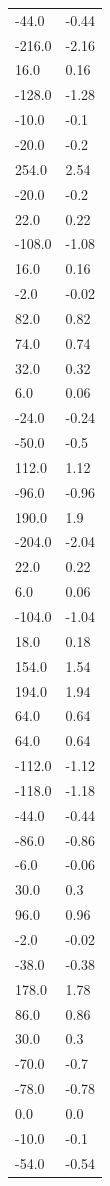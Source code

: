 \begin{longtable}{ll}
-44.0 & -0.44 \\
-216.0 & -2.16 \\
16.0 & 0.16 \\
-128.0 & -1.28 \\
-10.0 & -0.1 \\
-20.0 & -0.2 \\
254.0 & 2.54 \\
-20.0 & -0.2 \\
22.0 & 0.22 \\
-108.0 & -1.08 \\
16.0 & 0.16 \\
-2.0 & -0.02 \\
82.0 & 0.82 \\
74.0 & 0.74 \\
32.0 & 0.32 \\
6.0 & 0.06 \\
-24.0 & -0.24 \\
-50.0 & -0.5 \\
112.0 & 1.12 \\
-96.0 & -0.96 \\
190.0 & 1.9 \\
-204.0 & -2.04 \\
22.0 & 0.22 \\
6.0 & 0.06 \\
-104.0 & -1.04 \\
18.0 & 0.18 \\
154.0 & 1.54 \\
194.0 & 1.94 \\
64.0 & 0.64 \\
64.0 & 0.64 \\
-112.0 & -1.12 \\
-118.0 & -1.18 \\
-44.0 & -0.44 \\
-86.0 & -0.86 \\
-6.0 & -0.06 \\
30.0 & 0.3 \\
96.0 & 0.96 \\
-2.0 & -0.02 \\
-38.0 & -0.38 \\
178.0 & 1.78 \\
86.0 & 0.86 \\
30.0 & 0.3 \\
-70.0 & -0.7 \\
-78.0 & -0.78 \\
0.0 & 0.0 \\
-10.0 & -0.1 \\
-54.0 & -0.54 \\

\end{longtable}
